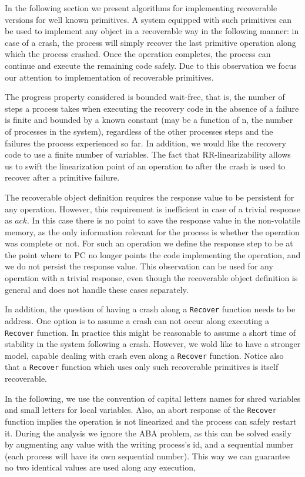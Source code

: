 In the following section we present algorithms for implementing recoverable versions for well known primitives. A system equipped with such primitives can be used to implement any object in a recoverable way in the following manner: in case of a crash, the process will simply recover the last primitive operation along which the process crashed. Once the operation completes, the process can continue and execute the remaining code safely. Due to this observation we focus our attention to implementation of recoverable primitives.

The progress property considered is bounded wait-free, that is, the number of steps a process takes when executing the recovery code in the absence of a failure is finite and bounded by a known constant (may be a function of n, the number of processes in the system), regardless of the other processes steps and the failures the process experienced so far. In addition, we would like the recovery code to use a finite number of variables.
The fact that RR-linearizability allows us to swift the linearization point of an operation to after the crash is used to recover after a primitive failure.

The recoverable object definition requires the response value to be persistent for any operation. However, this requirement is inefficient in case of a trivial response as $ack$. In this case there is no point to save the response value in the non-volatile memory, as the only information relevant for the process is whether the operation was complete or not. For such an operation we define the response step to be at the point where to PC no longer points the code implementing the operation, and we do not persist the response value. This observation can be used for any operation with a trivial response, even though the recoverable object definition is general and does not handle these cases separately.

In addition, the question of having a crash along a \texttt{Recover} function needs to be address. One option is to assume a crash can not occur along executing a \texttt{Recover} function. In practice this might be reasonable to assume a short time of stability in the system following a crash. However, we wold like to have a stronger model, capable dealing with crash even along a \texttt{Recover} function. Notice also that a \texttt{Recover} function which uses only such recoverable primitives is itself recoverable.

In the following, we use the convention of capital letters names for shred variables and small letters for local variables. Also, an abort response of the \texttt{Recover} function implies the operation is not linearized and the process can safely restart it. During the analysis we ignore the ABA problem, as this can be solved easily by augmenting any value with the writing process's id, and a sequential number (each process will have its own sequential number). This way we can guarantee no two identical values are used along any execution,

